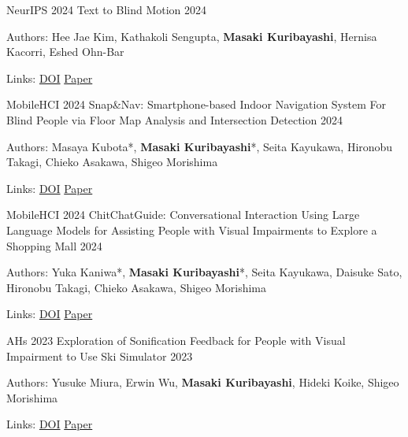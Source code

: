 \begin{cventries}
  \cventry
    {NeurIPS 2024}
    {Text to Blind Motion}
    {}
    {2024}
    {
      \begin{cvitems}
        \item {Authors: Hee Jae Kim, Kathakoli Sengupta, \textbf{Masaki Kuribayashi}, Hernisa Kacorri, Eshed Ohn-Bar}
        \item {Links: \href{https://doi.org/10.52202/079017-0519}{DOI} \enskip\textbar\enskip \href{https://www.masakikuribayashi.com/data/project/hee_jae_kim_neurips_2024/paper.pdf}{Paper}}
      \end{cvitems}
    }

  \cventry
    {MobileHCI 2024}
    {Snap\&Nav: Smartphone-based Indoor Navigation System For Blind People via Floor Map Analysis and Intersection Detection}
    {}
    {2024}
    {
      \begin{cvitems}
        \item {Authors: Masaya Kubota*, \textbf{Masaki Kuribayashi}*, Seita Kayukawa, Hironobu Takagi, Chieko Asakawa, Shigeo Morishima}
        \item {Links: \href{https://doi.org/10.1145/3676522}{DOI} \enskip\textbar\enskip \href{https://www.masakikuribayashi.com/data/project/masaya_kubota_mobilehci_2024/paper.pdf}{Paper}}
      \end{cvitems}
    }

  \cventry
    {MobileHCI 2024}
    {ChitChatGuide: Conversational Interaction Using Large Language Models for Assisting People with Visual Impairments to Explore a Shopping Mall}
    {}
    {2024}
    {
      \begin{cvitems}
        \item {Authors: Yuka Kaniwa*, \textbf{Masaki Kuribayashi}*, Seita Kayukawa, Daisuke Sato, Hironobu Takagi, Chieko Asakawa, Shigeo Morishima}
        \item {Links: \href{https://doi.org/10.1145/3676492}{DOI} \enskip\textbar\enskip \href{https://www.masakikuribayashi.com/data/project/yuka_kaniwa_mobilehci_2024/paper.pdf}{Paper}}
      \end{cvitems}
    }

  \cventry
    {AHs 2023}
    {Exploration of Sonification Feedback for People with Visual Impairment to Use Ski Simulator}
    {}
    {2023}
    {
      \begin{cvitems}
        \item {Authors: Yusuke Miura, Erwin Wu, \textbf{Masaki Kuribayashi}, Hideki Koike, Shigeo Morishima}
        \item {Links: \href{https://doi.org/10.1145/3582700.3582702}{DOI} \enskip\textbar\enskip \href{https://www.masakikuribayashi.com/data/project/yusuke_miura_ahs_2023/paper.pdf}{Paper}}
      \end{cvitems}
    }


\end{cventries}
